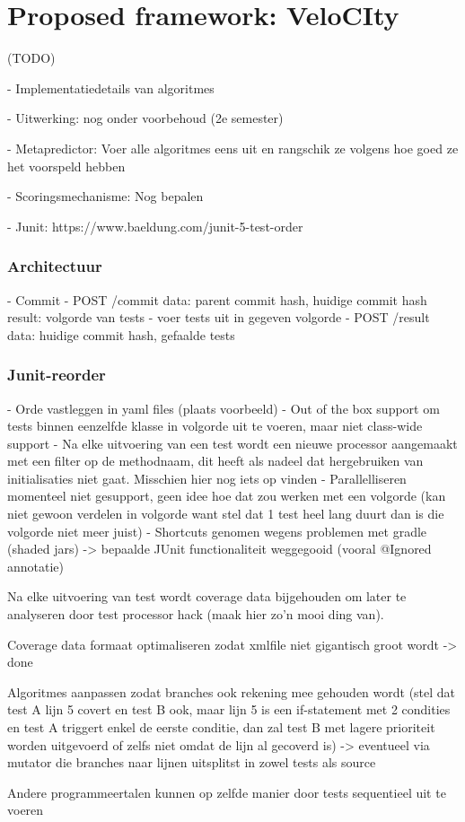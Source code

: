 
\chapter{Proposed framework: VeloCIty}
\label{chap:velocity}
(TODO)

- Implementatiedetails van algoritmes

- Uitwerking: nog onder voorbehoud (2e semester)

- Metapredictor: Voer alle algoritmes eens uit en rangschik ze volgens hoe goed ze het voorspeld hebben

- Scoringsmechanisme: Nog bepalen

- Junit: https://www.baeldung.com/junit-5-test-order

\subsection{Architectuur}
- Commit
- POST /commit
	data: parent commit hash, huidige commit hash
	result: volgorde van tests
- voer tests uit in gegeven volgorde
- POST /result
	data: huidige commit hash, gefaalde tests
	
\subsection{Junit-reorder}
- Orde vastleggen in yaml files (plaats voorbeeld)
- Out of the box support om tests binnen eenzelfde klasse in volgorde uit te voeren, maar niet class-wide support
- Na elke uitvoering van een test wordt een nieuwe processor aangemaakt met een filter op de methodnaam, dit heeft als nadeel dat hergebruiken van initialisaties niet gaat. Misschien hier nog iets op vinden
- Parallelliseren momenteel niet gesupport, geen idee hoe dat zou werken met een volgorde (kan niet gewoon verdelen in volgorde want stel dat 1 test heel lang duurt dan is die volgorde niet meer juist)
- Shortcuts genomen wegens problemen met gradle (shaded jars) -> bepaalde JUnit functionaliteit weggegooid (vooral @Ignored annotatie)

Na elke uitvoering van test wordt coverage data bijgehouden om later te analyseren door test processor hack (maak hier zo'n mooi ding van).

Coverage data formaat optimaliseren zodat xmlfile niet gigantisch groot wordt -> done

Algoritmes aanpassen zodat branches ook rekening mee gehouden wordt (stel dat test A lijn 5 covert en test B ook, maar lijn 5 is een if-statement met 2 condities en test A triggert enkel de eerste conditie, dan zal test B met lagere prioriteit worden uitgevoerd of zelfs niet omdat de lijn al gecoverd is) -> eventueel via mutator die branches naar lijnen uitsplitst in zowel tests als source

Andere programmeertalen kunnen op zelfde manier door tests sequentieel uit te voeren

